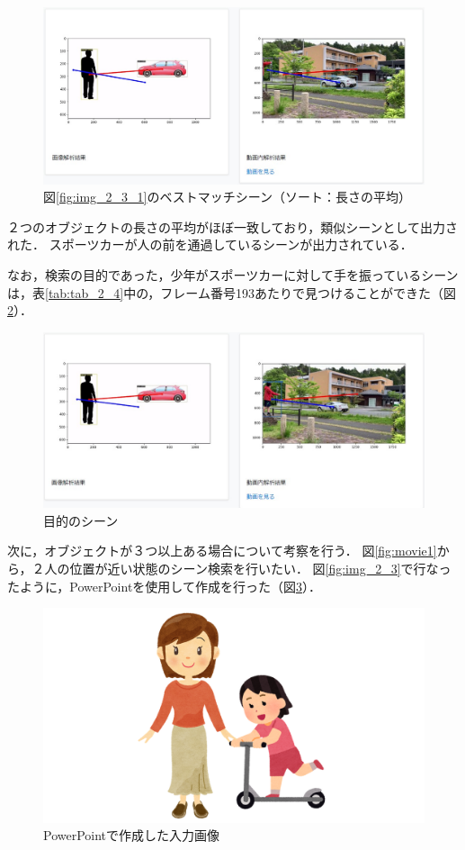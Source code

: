\documentclass[a4j,12pt,dvipdfmx]{jreport}
\begin{document}
\begin{figure}[H]
  \centering
  \includegraphics[width=13cm]{image/result_2_3_2.jpg}
  \caption{図\ref{fig:img_2_3_1}のベストマッチシーン（ソート：長さの平均）}
  \label{fig:img_2_3_2}
\end{figure}

２つのオブジェクトの長さの平均がほぼ一致しており，類似シーンとして出力された．
スポーツカーが人の前を通過しているシーンが出力されている．

なお，検索の目的であった，少年がスポーツカーに対して手を振っているシーンは，表\ref{tab:tab_2_4}中の，フレーム番号193あたりで見つけることができた（図\ref{fig:img_2_3_3}）．
\begin{figure}[H]
  \centering
  \includegraphics[width=13cm]{image/result_2_3_3.jpg}
  \caption{目的のシーン}
  \label{fig:img_2_3_3}
\end{figure}

次に，オブジェクトが３つ以上ある場合について考察を行う．
図\ref{fig:movie1}から，２人の位置が近い状態のシーン検索を行いたい．
図\ref{fig:img_2_3}で行なったように，PowerPointを使用して作成を行った（図\ref{fig:img_2_4}）．

\begin{figure}[H]
  \centering
  \includegraphics[width=13cm]{image/result_2_4.PNG}
  \caption{PowerPointで作成した入力画像}
  \label{fig:img_2_4}
\end{figure}
\end{document}

